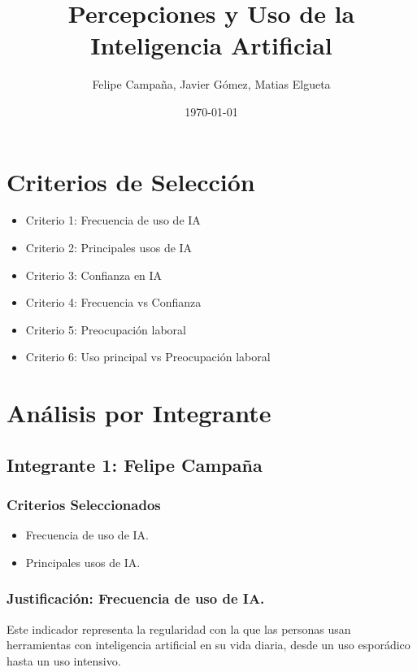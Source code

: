\documentclass[12pt, a4paper]{article}
\title{Percepciones y Uso de la Inteligencia Artificial}
\author{Felipe Campaña, Javier Gómez, Matias Elgueta}
\date{\today\\[2cm]}
\begin{document}
\maketitle

\section*{Criterios de Selección}
\begin{itemize}
    \item Criterio 1: Frecuencia de uso de IA
    \item Criterio 2: Principales usos de IA	
    \item Criterio 3: Confianza en IA
    \item Criterio 4: Frecuencia vs Confianza
    \item Criterio 5: Preocupación laboral
    \item Criterio 6: Uso principal vs Preocupación laboral	
\end{itemize}



\section*{Análisis por Integrante}

\subsection*{Integrante 1: Felipe Campaña}

\subsubsection*{Criterios Seleccionados}
\begin{itemize}
    \item Frecuencia de uso de IA.
    \item Principales usos de IA.
\end{itemize}

\subsubsection*{Justificación: Frecuencia de uso de IA.}
Este indicador representa la regularidad con la que las personas usan herramientas con inteligencia artificial en su vida diaria, desde un uso esporádico hasta un uso intensivo.
\end{document}
